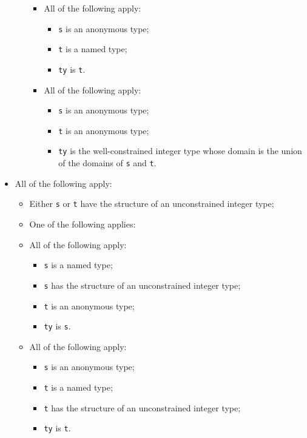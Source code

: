 \documentclass{book}
\begin{document}
\begin{itemize}
\begin{itemize}
\begin{itemize}
      \item All of the following apply:
        \begin{itemize}
        \item \texttt{s} is an anonymous type;
        \item \texttt{t} is a named type;
        \item \texttt{ty} is \texttt{t}.
        \end{itemize}

      \item All of the following apply:
        \begin{itemize}
        \item \texttt{s} is an anonymous type;
        \item \texttt{t} is an anonymous type;
	\item \texttt{ty} is the well-constrained integer type whose domain is the union of the
	  domains of \texttt{s} and \texttt{t}.      
        \end{itemize}
      \end{itemize}
    \end{itemize}

  \item All of the following apply:
    \begin{itemize}
    \item Either \texttt{s} or \texttt{t} have the structure of an unconstrained integer type;
    \item One of the following applies:

      \item All of the following apply:
        \begin{itemize}
        \item \texttt{s} is a named type;
        \item \texttt{s} has the structure of an unconstrained integer type;
        \item \texttt{t} is an anonymous type;
        \item \texttt{ty} is \texttt{s}.
        \end{itemize}

      \item All of the following apply:
        \begin{itemize}
        \item \texttt{s} is an anonymous type;
        \item \texttt{t} is a named type;
        \item \texttt{t} has the structure of an unconstrained integer type;
        \item \texttt{ty} is \texttt{t}.
        \end{itemize}


\end{itemize}
\end{itemize}
\end{document}
